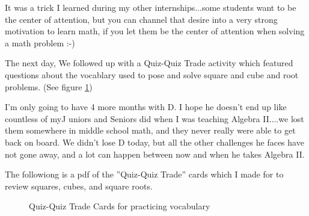 \documentclass[11pt]{elegantbook}
\begin{document}
It was a trick I learned during my other internships...some students
want to be the center of attention, but you can channel that desire
into a very strong motivation to learn math, if you let them be the
center of attention when solving a math problem :-)

The next day, We followed up with a Quiz-Quiz Trade activity
which featured questions about the vocablary used to pose and solve
square and cube and root problems. (See figure \ref{qqt_root})

I'm only going to have 4 more months with D.  I hope he doesn't end up
like countless of myJ uniors and Seniors did when I was teaching
Algebra II....we lost them somewhere in middle school math, and they
never really were able to get back on board.  We didn't lose D today,
but all the other challenges he faces have not gone away, and a lot
can happen between now and when he takes Algebra II.









The followiong is a pdf of the ''Quiz-Quiz Trade'' cards which I made
for to review squares, cubes, and square roots.

\begin{figure}
  
  \caption{Quiz-Quiz Trade Cards for practicing vocabulary}
  \label{qqt_root}
\end{figure}
\end{document}

